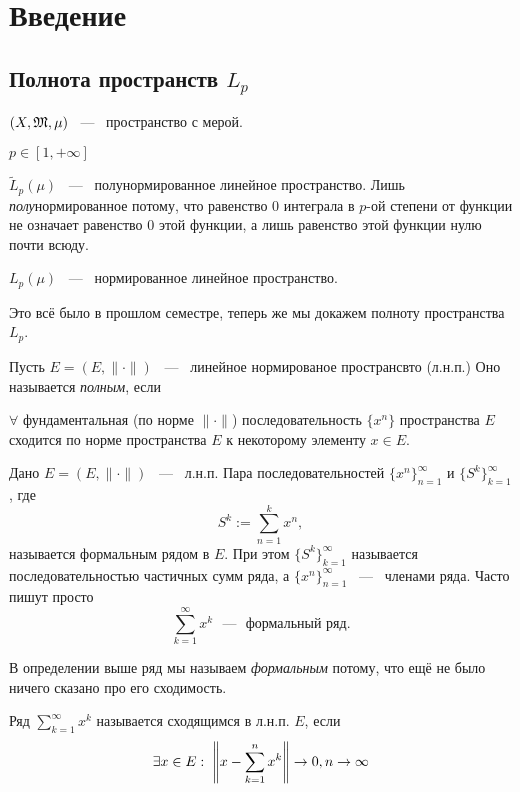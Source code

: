 \section{Введение}
\subsection{Полнота пространств $L_p$}

\noindent

$(X, \mathfrak{M}, \mu)$ ~---~ пространство с мерой.

$p \in [1, +\infty]$

$\widetilde L_p (\mu)$  ~---~ полунормированное линейное пространство. Лишь \textit{полу}нормированное потому, что равенство 0 интеграла в $p$-ой степени от функции не означает равенство 0 этой функции, а лишь равенство этой функции нулю почти всюду.

$L_p (\mu)$ ~---~ нормированное линейное пространство.

Это всё было в прошлом семестре, теперь же мы докажем полноту пространства $L_p$.

\begin{definition}
	Пусть $E = (E, \|\cdot\|)$  ~---~ линейное нормированое пространсвто (л.н.п.) Оно называется \textit{полным}, если
	
	$\forall$ фундаментальная (по норме $\|\cdot\|$) последовательность $\{x^n\}$ пространства $E$ сходится по норме пространства $E$ к некоторому элементу $x \in E$.
\end{definition}

\begin{definition}
	Дано $E = (E, \|\cdot\|)$  ~---~ л.н.п. Пара последовательностей $\{x^n\}_{n=1}^{\infty}$ и $\{S^k\}_{k=1}^\infty$, где \[
		S^k := \sum_{n=1}^k x^n ,
	\]
	называется формальным рядом в $E$. При этом $\{S^k\}_{k=1}^\infty$ называется последовательностью частичных сумм ряда, а $\{x^n\}_{n=1}^{\infty}$ ~---~ членами ряда. Часто пишут просто \[
		\sum_{k=1}^{\infty} x^k\text{ ~---~ формальный ряд.}
	\]
\end{definition}
\begin{note}
	В определении выше ряд мы называем \textit{формальным} потому, что ещё не было ничего сказано про его сходимость.
\end{note}
\begin{definition}
	Ряд $\sum\limits_{k=1}^\infty x^k$ называется сходящимся в л.н.п. $E$, если \[
	\exists x \in E:\; \left\|x - \sum_{k=1}^n x^k \right\| \rightarrow 0, n \rightarrow \infty
	\]
\end{definition}

